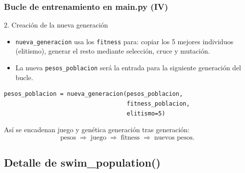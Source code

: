 \documentclass[
	11pt, %
]{beamer}
\begin{document}

\begin{frame}[fragile]
\frametitle{Bucle de entrenamiento en main.py (IV)}

\vspace{6pt}
2. Creación de la nueva generación

\begin{itemize}
    \item \texttt{nueva\_generacion} usa los \texttt{fitness} para:
        copiar los 5 mejores individuos (elitismo),
        generar el resto mediante selección, cruce y mutación.
    \item La nueva \texttt{pesos\_poblacion} será la entrada
          para la siguiente generación del bucle.
\end{itemize}

{\scriptsize
\begin{verbatim}
pesos_poblacion = nueva_generacion(pesos_poblacion,
                                   fitness_poblacion,
                                   elitismo=5)
\end{verbatim}
}

\vspace{4pt}
Así se encadenan juego y genética generación tras generación:
\[
\text{pesos} \;\Rightarrow\; \text{juego} \;\Rightarrow\; \text{fitness}
\;\Rightarrow\; \text{nuevos pesos}.
\]

\end{frame}


\subsection{Detalle de swim\_population()}
\end{document}
